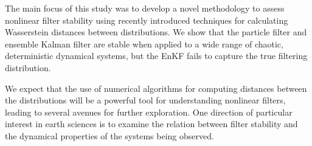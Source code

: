 
The main focus of this study was to develop a novel methodology to assess nonlinear filter stability using recently introduced techniques for calculating Wasserstein distances between distributions. We show that the particle filter and ensemble Kalman filter are stable when applied to a wide range of chaotic, deterministic dynamical systems, but the EnKF fails to capture the true filtering distribution.

We expect that the use of numerical algorithms for computing distances between the distributions will be a powerful tool for understanding nonlinear filters, leading to several avenues for further exploration. One direction of particular interest in earth sciences is to examine the relation between filter stability and the dynamical properties of the systems being observed.